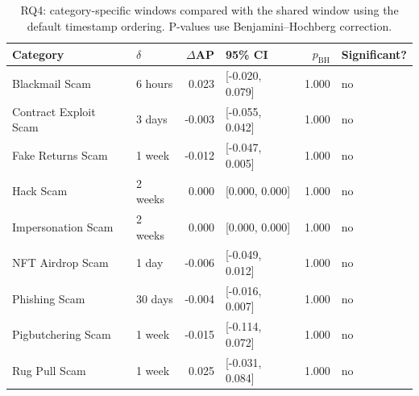 \begin{table}[ht]
\centering
\caption{RQ4: category-specific windows compared with the shared window using the default timestamp ordering. P-values use Benjamini--Hochberg correction.}
\label{tab:res_rq4_categories}
\footnotesize
\begin{tabular}{@{}l l r l r l@{}}
\toprule
\textbf{Category} & \textbf{$\delta$} & \textbf{$\Delta$AP} & \textbf{95\% CI} & \textbf{$p_{\mathrm{BH}}$} & \textbf{Significant?} \\
\midrule
Blackmail Scam & 6 hours & 0.023 & [-0.020, 0.079] & 1.000 & no \\
Contract Exploit Scam & 3 days & -0.003 & [-0.055, 0.042] & 1.000 & no \\
Fake Returns Scam & 1 week & -0.012 & [-0.047, 0.005] & 1.000 & no \\
Hack Scam & 2 weeks & 0.000 & [0.000, 0.000] & 1.000 & no \\
Impersonation Scam & 2 weeks & 0.000 & [0.000, 0.000] & 1.000 & no \\
NFT Airdrop Scam & 1 day & -0.006 & [-0.049, 0.012] & 1.000 & no \\
Phishing Scam & 30 days & -0.004 & [-0.016, 0.007] & 1.000 & no \\
Pigbutchering Scam & 1 week & -0.015 & [-0.114, 0.072] & 1.000 & no \\
Rug Pull Scam & 1 week & 0.025 & [-0.031, 0.084] & 1.000 & no \\
\bottomrule
\end{tabular}
\end{table}
